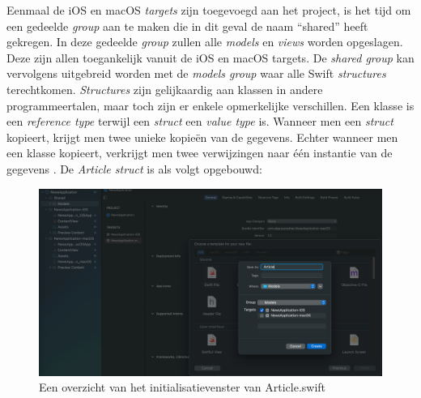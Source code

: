 \newpage
Eenmaal de iOS en macOS \textit{targets} zijn toegevoegd aan het project, is het tijd om een gedeelde \textit{group} aan te maken die in dit geval de naam “shared” heeft gekregen. In deze gedeelde \textit{group} zullen alle \textit{models} en \textit{views} worden opgeslagen. Deze zijn allen toegankelijk vanuit de iOS en macOS targets. De \textit{shared group} kan vervolgens uitgebreid worden met de \textit{models group} waar alle Swift \textit{structures} terechtkomen. \textit{Structures} zijn gelijkaardig aan klassen in andere programmeertalen, maar toch zijn er enkele opmerkelijke verschillen. Een klasse is een \textit{reference type} terwijl een \textit{struct} een \textit{value type} is. Wanneer men een \textit{struct} kopieert, krijgt men twee unieke kopieën van de gegevens. Echter wanneer men een klasse kopieert, verkrijgt men twee verwijzingen naar één instantie van de gegevens \autocite{Khan2021}. De \textit{Article struct} is als volgt opgebouwd: 

\begin{figure}[!h]
    \centering
    \includegraphics[width=120mm, scale=0.7]{img/articleswift.png}
    \caption{Een overzicht van het initialisatievenster van Article.swift}
\end{figure}

